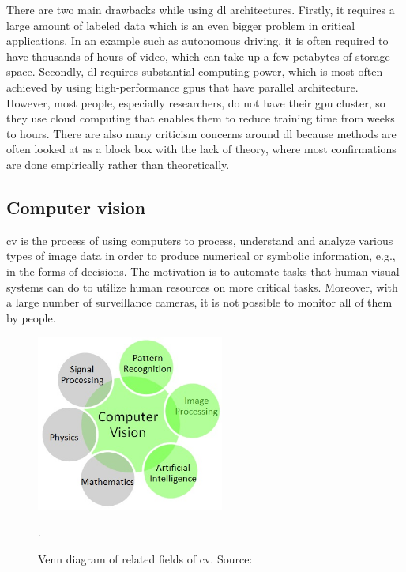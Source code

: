         There are two main drawbacks while using \gls{dl} architectures. Firstly, it requires a large amount of labeled data which is an even bigger problem in critical applications. In an example such as autonomous driving, it is often required to have thousands of hours of video, which can take up a few petabytes of storage space. Secondly, \gls{dl} requires substantial computing power, which is most often achieved by using high-performance \gls{gpu}s that have parallel architecture. However, most people, especially researchers, do not have their \gls{gpu} cluster, so they use cloud computing that enables them to reduce training time from weeks to hours. There are also many criticism concerns around \gls{dl} because methods are often looked at as a block box with the lack of theory, where most confirmations are done empirically rather than theoretically.
        
    \subsection{Computer vision}
        \Gls{cv} is the process of using computers to process, understand and analyze various types of image data in order to produce numerical or symbolic information, e.g., in the forms of decisions. The motivation is to automate tasks that human visual systems can do to utilize human resources on more critical tasks. Moreover, with a large number of surveillance cameras, it is not possible to monitor all of them by people. 
        
        \begin{figure}[ht]
            \centering
            \includegraphics[width=0.55\textwidth]{resources/computer-vision-venn.png}
            \caption{Venn diagram of related fields of \gls{cv}. Source: \cite{khandelwalcv}}.
            \label{fig:convolutional neural netwok}
        \end{figure}
        
